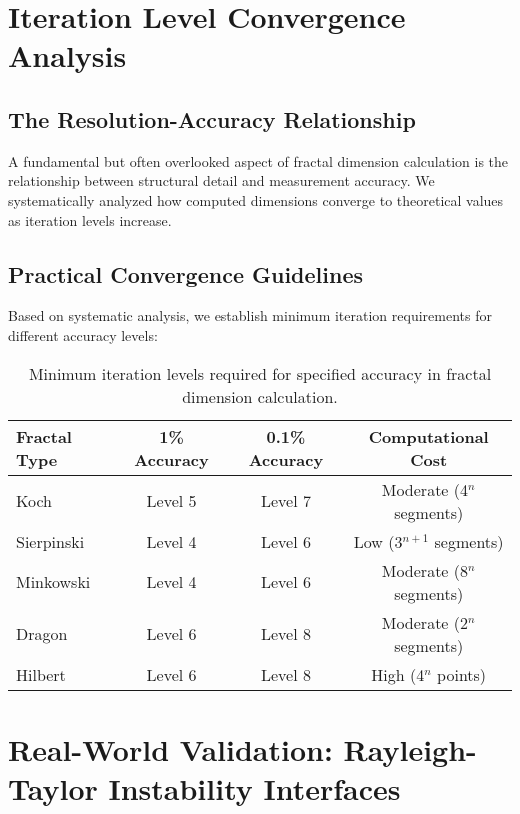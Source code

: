 \documentclass[preprint,12pt]{elsarticle}
\def\textbf#1{#1}%
\begin{document}
\section{Iteration Level Convergence Analysis}
\label{sec:iteration}

\subsection{The Resolution-Accuracy Relationship}

A fundamental but often overlooked aspect of fractal dimension calculation is the relationship between structural detail and measurement accuracy. We systematically analyzed how computed dimensions converge to theoretical values as iteration levels increase.

\subsection{Practical Convergence Guidelines}

Based on systematic analysis, we establish minimum iteration requirements for different accuracy levels:

\begin{table}[H]
\centering
\begin{tabular}{@{}lccc@{}}
\toprule
\textbf{Fractal Type} & \textbf{1\% Accuracy} & \textbf{0.1\% Accuracy} & \textbf{Computational Cost} \\
\midrule
Koch & Level 5 & Level 7 & Moderate (4$^n$ segments) \\
Sierpinski & Level 4 & Level 6 & Low (3$^{n+1}$ segments) \\
Minkowski & Level 4 & Level 6 & Moderate (8$^n$ segments) \\
Dragon & Level 6 & Level 8 & Moderate (2$^n$ segments) \\
Hilbert & Level 6 & Level 8 & High (4$^n$ points) \\
\bottomrule
\end{tabular}
\caption{Minimum iteration levels required for specified accuracy in fractal dimension calculation.}
\label{tab:convergence_requirements}
\end{table}

\section{Real-World Validation: Rayleigh-Taylor Instability Interfaces}
\label{sec:rt_validation}
\end{document}
